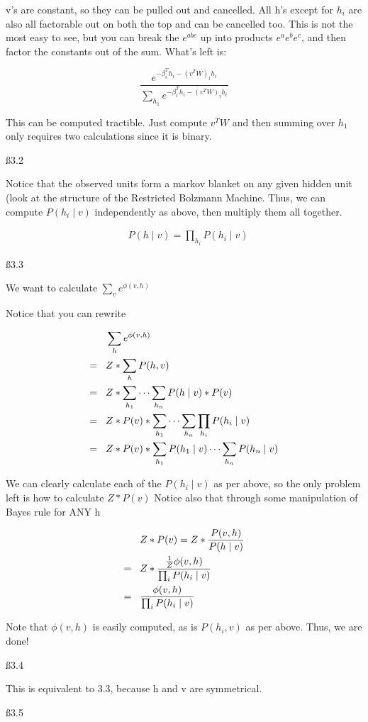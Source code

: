 v's are constant, so they can be pulled out and cancelled. All h's except for $h_i$ are also all factorable out on both the top and can be cancelled too. This is not the most easy to see, but you can break the $e^{abc}$ up into products $e^ae^be^c$, and then factor the constants out of the sum. What's left is:

\[
\frac { e^{-\beta^T_ih_i-(v^TW)_ih_i}}{\sum_{h_1} e^{-\beta^T_ih_i-(v^TW)_ih_i}}
\]

This can be computed tractible. Just compute $v^TW$ and then summing over $h_1$ only requires two calculations since it is binary.

\ss{3.2}

Notice that the observed units form a markov blanket on any given hidden unit (look at the structure of the Restricted Bolzmann Machine. Thus, we can compute $ P (h_i \mid v) $ independently as above, then multiply them all together.

\begin{align*}
& P(h \mid v) = \prod_{h_i} P(h_i \mid v)
\end{align*}

\ss{3.3}

We want to calculate $\sum_v e^{\phi(v,h)}$

Notice that you can rewrite

\begin{align*}
& \sum_h e^{\phi(v,h)}
\\ = \hspace{3 mm} & Z * \sum_h P(h,v) \\ = \hspace{3 mm} & Z* \sum_{h_1} \dots \sum_{h_n} P(h \mid v) * P(v) \\ = \hspace{3 mm} & Z* P(v) * \sum_{h_1} \dots \sum_{h_n} \prod_{h_i} P(h_i \mid v)
\\ = \hspace{3 mm} & Z* P(v) * \sum_{h_1} P(h_1 \mid v) \dots \sum_{h_n} P(h_n \mid v) 
\end{align*}

We can clearly calculate each of the $P(h_i \mid v)$ as per above, so the only problem left is how to calculate $Z* P(v)$
Notice also that through some manipulation of Bayes rule for ANY h

\begin{align*}
& Z*P(v) = Z*\frac{P(v,h)}{P(h \mid v)}
\\ = \hspace{3 mm} & Z* \frac{ \frac{1}{Z}\phi(v,h)}{\prod_i P(h_i \mid v)} \\ = \hspace{3 mm} & \frac{ \phi(v,h)}{\prod_i P(h_i \mid v)}
\end{align*}

Note that $\phi(v,h)$ is easily computed, as is $P(h_i, v)$ as per above. Thus, we are done!

\ss{3.4}

This is equivalent to 3.3, because h and v are symmetrical.

\ss{3.5}

